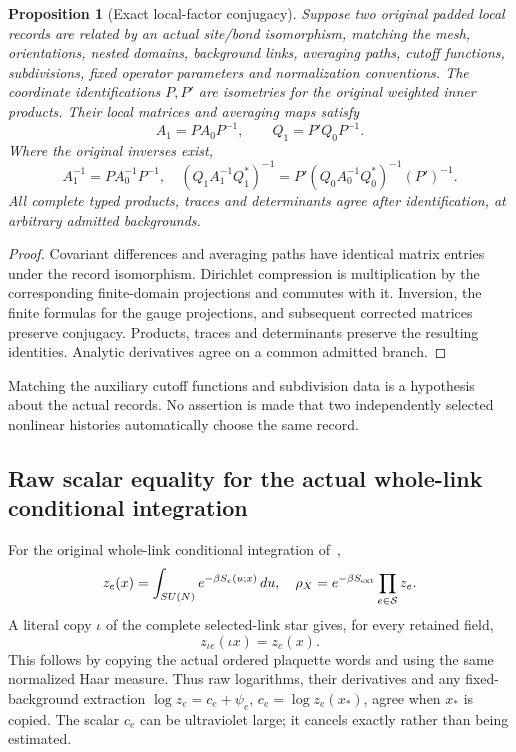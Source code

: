 \documentclass[11pt,letterpaper]{article}
\newtheorem{proposition}[theorem]{Proposition}
\theoremstyle{remark}\newtheorem{remark}[theorem]{Remark}
\begin{document}
\begin{proposition}[Exact local-factor conjugacy]\label{prop:copy}
Suppose two original padded local records are related by an actual site/bond isomorphism, matching the mesh, orientations, nested domains, background links, averaging paths, cutoff functions, subdivisions, fixed operator parameters and normalization conventions. The coordinate identifications $P,P'$ are isometries for the original weighted inner products. Their local matrices and averaging maps satisfy
\[
 A_1=P A_0P^{-1},\qquad Q_1=P'Q_0P^{-1}.
\]
Where the original inverses exist,
\[
 A_1^{-1}=PA_0^{-1}P^{-1},\quad
 (Q_1A_1^{-1}Q_1^*)^{-1}
 =P'(Q_0A_0^{-1}Q_0^*)^{-1}(P')^{-1}.
\]
All complete typed products, traces and determinants agree after identification, at arbitrary admitted backgrounds.
\end{proposition}
\begin{proof}
Covariant differences and averaging paths have identical matrix entries under the record isomorphism. Dirichlet compression is multiplication by the corresponding finite-domain projections and commutes with it. Inversion, the finite formulas for the gauge projections, and subsequent corrected matrices preserve conjugacy. Products, traces and determinants preserve the resulting identities. Analytic derivatives agree on a common admitted branch.
\end{proof}

Matching the auxiliary cutoff functions and subdivision data is a hypothesis about the actual records. No assertion is made that two independently selected nonlinear histories automatically choose the same record.

\subsection{Raw scalar equality for the actual whole-link conditional integration}

For the original whole-link conditional integration of~\cite[\S2]{SZ},
\[
 z_e(x)=\int_{SU(N)}e^{-\beta S_e(u;x)}\,d u,\quad
 \rho_X=e^{-\beta S_{\rm ext}}\prod_{e\in\mathcal S}z_e.
\]
A literal copy $\iota$ of the complete selected-link star gives, for every retained field,
\begin{equation}\label{eq:rawcopy}
 z_{\iota e}(\iota x)=z_e(x).
\end{equation}
This follows by copying the actual ordered plaquette words and using the same normalized Haar measure. Thus raw logarithms, their derivatives and any fixed-background extraction
$\log z_e=c_e+\psi_e$, $c_e=\log z_e(x_*)$, agree when $x_*$ is copied. The scalar $c_e$ can be ultraviolet large; it cancels exactly rather than being estimated.
\end{document}
